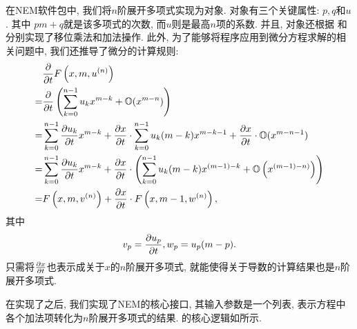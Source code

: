 在NEM软件包中, 我们将$n$阶展开多项式实现为对象. 对象有三个关键属性: $p,q$和$u$. 其中 $pm+q$就是该多项式的次数, 而$u$则是最高$n$项的系数. 并且, 对象还根据\D {} 和  分别实现了移位\D 乘法和加法操作. 此外, 为了能够将程序应用到微分方程求解的相关问题中, 我们还推导了微分的计算规则:
\begin{equation}
\begin{aligned}
& \frac{\partial}{\partial t}F\left(x,m,u^{(n)}\right)  \\
=& \frac{\partial}{\partial t}\left(\sum_{k=0}^{n-1}{u_k x^{m-k}}+\mathbb O(x^{m-n})\right) \\
=& \sum_{k=0}^{n-1}{\frac{\partial u_k}{\partial t}x^{m-k}}+\frac{\partial x}{\partial t}\cdot\sum_{k=0}^{n-1}{u_k (m-k) x^{m-k-1}}+\frac{\partial x}{\partial t}\cdot\mathbb O(x^{m-n-1}) \\
=& \sum_{k=0}^{n-1}{\frac{\partial u_k}{\partial t}x^{m-k}}+\frac{\partial x}{\partial t}\cdot\left(\sum_{k=0}^{n-1}{u_k (m-k) x^{(m-1)-k}}+\mathbb O\left(x^{(m-1)-n)}\right)\right) \\ 
=& F\left(x,m,v^{(n)}\right)+\frac{\partial x}{\partial t}\cdot F\left(x,m-1,w^{(n)}\right), 
\end{aligned}\label{NEM-diff}
\end{equation}
其中 
\begin{equation}
v_p=\frac{\partial u_p}{\partial t}, w_p=u_p(m-p).
\end{equation}
只需将$\frac{\partial x}{\partial t}$也表示成关于$x$的$n$阶展开多项式, 就能使得关于导数的计算结果也是$n$阶展开多项式. 

在实现了之后, 我们实现了NEM的核心接口, 其输入参数是一个列表, 表示方程中各个加法项转化为$n$阶展开多项式的结果. 的核心逻辑如所示. 

